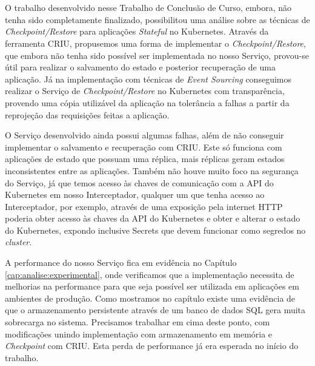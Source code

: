 

\chapter{} \label{cap:conclusion}

	O trabalho desenvolvido nesse Trabalho de Conclusão de Curso, embora, não 
	tenha sido completamente finalizado, possibilitou uma análise sobre as técnicas
	de \textit{Checkpoint/Restore} para aplicações \textit{Stateful} no Kubernetes.
	Através da ferramenta CRIU, propusemos uma forma de implementar o
	\textit{Checkpoint/Restore}, que embora não tenha sido possível ser implementada
	no nosso Serviço, provou-se útil para realizar o salvamento do estado e posterior
	recuperação de uma aplicação. Já na implementação com técnicas de
	\textit{Event Sourcing} conseguimos realizar o Serviço de \textit{Checkpoint/Restore}
	no Kubernetes com transparência, provendo uma cópia utilizável da aplicação na
	tolerância a falhas a partir da reprojeção das requisições feitas a aplicação.
	
	O Serviço desenvolvido ainda possui algumas falhas, além de não conseguir
	implementar	o salvamento e recuperação com CRIU. Este só funciona com aplicações
	de estado que possuam uma réplica, mais réplicas geram estados inconsistentes
	entre as aplicações. Também não houve muito foco na segurança do
	Serviço, já que temos acesso às chaves de comunicação com a API do Kubernetes
	em nosso Interceptador, qualquer um que tenha acesso ao Interceptador, por
	exemplo, através de uma exposição pela internet HTTP poderia obter acesso às
	chaves da API do Kubernetes e obter e alterar o estado do Kubernetes, expondo
	inclusive Secrets que devem funcionar como segredos no \textit{cluster}.

	A performance do nosso Serviço fica em evidência no Capítulo \ref{cap:analise:experimental},
	onde verificamos que a implementação necessita de melhorias na performance para
	que seja possível ser utilizada em aplicações em ambientes de produção. Como
	mostramos no capítulo existe uma evidência de que o armazenamento persistente
	através de um banco de dados SQL gera muita sobrecarga no sistema. Precisamos
	trabalhar em cima deste ponto, com modificações unindo implementação com
	armazenamento em memória e \textit{Checkpoint} com CRIU. Esta perda de
	performance já era esperada no início do trabalho.

